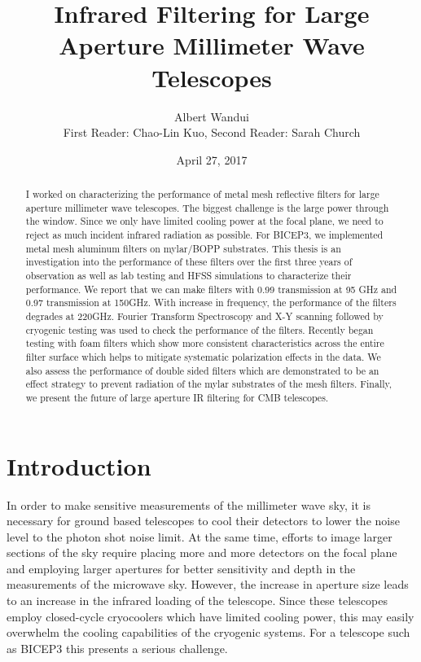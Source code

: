 \documentclass[12pt]{article}
\begin{document}
\title{Infrared Filtering for Large Aperture Millimeter Wave Telescopes}
\author{Albert Wandui \\
First Reader: Chao-Lin Kuo, Second Reader: Sarah Church}
\date{April 27, 2017}
        \maketitle
        \begin{abstract}
        I worked on characterizing the performance of metal mesh reflective filters for large aperture millimeter wave telescopes. The biggest challenge is the large power through the window. Since we only have limited cooling power at the focal plane, we need to reject as much incident infrared radiation as possible. For BICEP3, we implemented metal mesh aluminum filters on mylar/BOPP substrates. This thesis is an investigation into the performance of these filters over the first three years of observation as well as lab testing and HFSS simulations to characterize their performance. We report that we can make filters with 0.99 transmission at 95 GHz and 0.97 transmission at 150GHz. With increase in frequency, the performance of the filters degrades at 220GHz. Fourier Transform Spectroscopy and X-Y scanning followed by cryogenic testing was used to check the performance of the filters. Recently began testing with foam filters which show more consistent characteristics across the entire filter surface which helps to mitigate systematic polarization effects in the data. We also assess the performance of double sided filters which are demonstrated to be an effect strategy to prevent radiation of the mylar substrates of the mesh filters. Finally, we present the future of large aperture IR filtering for CMB telescopes. 
        \end{abstract}
\section{Introduction}

In order to make sensitive measurements of the millimeter wave sky, it is necessary for ground based telescopes to cool their detectors to lower the noise level to the photon shot noise limit. At the same time, efforts to image larger sections of the sky require placing more and more detectors on the focal plane and employing larger apertures for better sensitivity and depth in the measurements of the microwave sky. However, the increase in aperture size leads to an increase in the infrared loading of the telescope. Since these telescopes employ closed-cycle cryocoolers which have limited cooling power, this may easily overwhelm the cooling capabilities of the cryogenic systems. For a telescope such as BICEP3 this presents a serious challenge.
\end{document}
